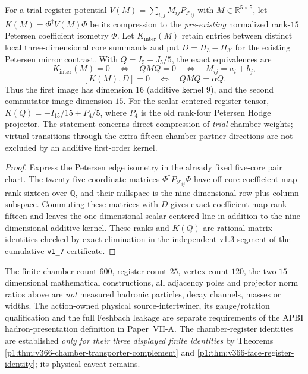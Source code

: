 \documentclass[11pt]{article}
\begin{document}
\begin{proposition}
\label{p1:prop:v366-register-mirror-contrast}
For a trial register potential
$V(M)=\sum_{i,j}M_{ij}P_{\mathscr F_{ij}}$ with
$M\in\mathbb R^{5\times5}$, let
$K(M)=\Phi^{\dagger}V(M)\Phi$ be its compression to the
\emph{pre-existing} normalized rank-$15$ Petersen coefficient
isometry $\Phi$.  Let $K_{\mathrm{inter}}(M)$ retain entries
between distinct local three-dimensional core summands and put
$D=\Pi_3-\Pi_{3'}$ for the existing Petersen mirror contrast.
With $Q=I_5-J_5/5$, the exact equivalences are
\[
 K_{\mathrm{inter}}(M)=0\quad\Longleftrightarrow\quad
 QMQ=0\quad\Longleftrightarrow\quad M_{ij}=a_i+b_j,
\]
\[
 [K(M),D]=0\quad\Longleftrightarrow\quad QMQ=\alpha Q.
\]
Thus the first image has dimension $16$ (additive kernel
$9$), and the second commutator image dimension $15$.
For the scalar centered register tensor,
$K(Q)=-I_{15}/15+P_4/5$, where $P_4$ is the old
rank-four Petersen Hodge projector.  The statement concerns
direct compression of \emph{trial} chamber weights; virtual
transitions through the extra fifteen chamber partner directions
are not excluded by an additive first-order kernel.
\end{proposition}
\begin{proof}
Express the Petersen edge isometry in the already fixed
five-core pair chart.  The twenty-five coordinate matrices
$\Phi^{\dagger}P_{\mathscr F_{ij}}\Phi$ have off-core
coefficient-map rank sixteen over $\mathbb Q$, and their
nullspace is the nine-dimensional row-plus-column subspace.
Commuting these matrices with $D$ gives exact coefficient-map
rank fifteen and leaves the one-dimensional scalar centered
line in addition to the nine-dimensional additive kernel.
These ranks and $K(Q)$ are rational-matrix identities checked
by exact elimination in the independent v1.3 segment of the
cumulative \texttt{v1\_7} certificate.
\end{proof}

\begin{remark}
\label{p1:rem:v366-chamber-physical-firewall}
The finite chamber count $600$, register count $25$, vertex count
$120$, the two $15$-dimensional mathematical constructions, all
adjacency poles and projector norm ratios above are \emph{not}
measured hadronic particles, decay channels, masses or widths.
The action-owned physical source-intertwiner, its gauge/rotation
qualification and the full Feshbach leakage are separate
requirements of the APBI hadron-presentation definition in Paper~VII-A.
The chamber-register identities are established \emph{only for their
three displayed finite identities} by Theorems
\ref{p1:thm:v366-chamber-transporter-complement} and
\ref{p1:thm:v366-face-register-identity}; its physical caveat remains.
\end{remark}
\end{document}
